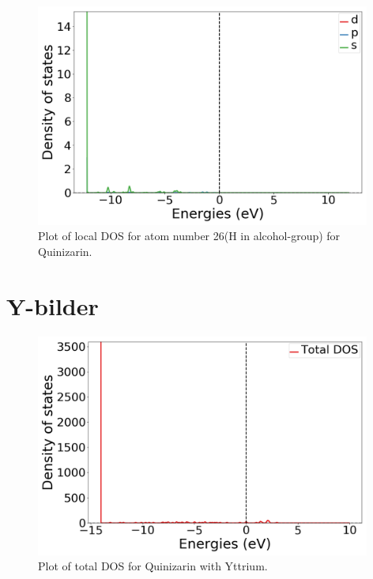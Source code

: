 \documentclass{article}
\begin{document}
  \begin{figure}[H]
      \centering
      \includegraphics[width = 11cm]{../fig/basic_LDOS26_1.png}
      \caption{Plot of local DOS for atom number 26(H in alcohol-group) for Quinizarin. }
      \label{fig:basic_LDOS26_1}
  \end{figure}

\vspace{1cm}

\section{Y-bilder}


  \begin{figure}[H]
      \centering
      \includegraphics[width = 11cm]{../fig/Y_TDOS_1.png}
      \caption{Plot of total DOS for Quinizarin with Yttrium. }
      \label{fig:Y_TDOS_1.png}
  \end{figure}
\end{document}
